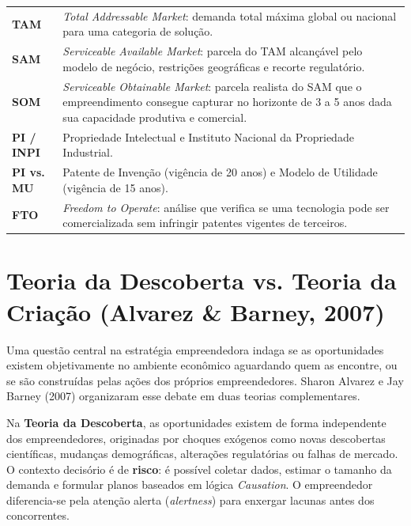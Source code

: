 
\begin{boxSimbolo}
  \begin{tabularx}{\textwidth}{@{}l >{\raggedright\arraybackslash}X@{}}
    \textbf{TAM} & \textit{Total Addressable Market}: demanda total máxima global ou nacional para uma categoria de solução. \\
    \textbf{SAM} & \textit{Serviceable Available Market}: parcela do TAM alcançável pelo modelo de negócio, restrições geográficas e recorte regulatório. \\
    \textbf{SOM} & \textit{Serviceable Obtainable Market}: parcela realista do SAM que o empreendimento consegue capturar no horizonte de 3 a 5 anos dada sua capacidade produtiva e comercial. \\
    \textbf{PI / INPI} & Propriedade Intelectual e Instituto Nacional da Propriedade Industrial. \\
    \textbf{PI vs. MU} & Patente de Invenção (vigência de 20 anos) e Modelo de Utilidade (vigência de 15 anos). \\
    \textbf{FTO} & \textit{Freedom to Operate}: análise que verifica se uma tecnologia pode ser comercializada sem infringir patentes vigentes de terceiros. \\
  \end{tabularx}
\end{boxSimbolo}

\section{Teoria da Descoberta vs. Teoria da Criação (Alvarez \& Barney, 2007)}

Uma questão central na estratégia empreendedora indaga se as oportunidades existem objetivamente no ambiente econômico aguardando quem as encontre, ou se são construídas pelas ações dos próprios empreendedores. Sharon Alvarez e Jay Barney (2007) organizaram esse debate em duas teorias complementares.

Na \textbf{Teoria da Descoberta}, as oportunidades existem de forma independente dos empreendedores, originadas por choques exógenos como novas descobertas científicas, mudanças demográficas, alterações regulatórias ou falhas de mercado. O contexto decisório é de \textbf{risco}: é possível coletar dados, estimar o tamanho da demanda e formular planos baseados em lógica \textit{Causation}. O empreendedor diferencia-se pela atenção alerta (\textit{alertness}) para enxergar lacunas antes dos concorrentes.

